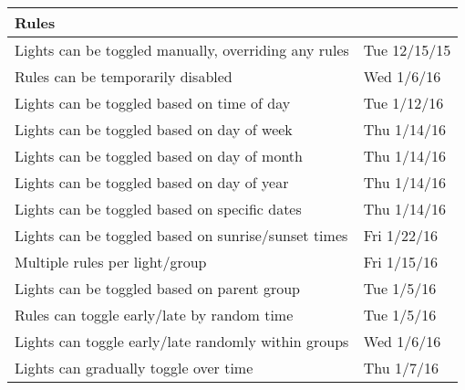 \documentclass[oneside,openright]{book}
\begin{document}
\begin{tabular}{ | l | l | }
   \textbf{Rules} & \\ \hline
   
   Lights can be toggled manually, overriding any rules & Tue 12/15/15 \\ \hline
   Rules can be temporarily disabled & Wed 1/6/16 \\ \hline
   Lights can be toggled based on time of day & Tue 1/12/16 \\ \hline
   Lights can be toggled based on day of week & Thu 1/14/16 \\ \hline
   Lights can be toggled based on day of month & Thu 1/14/16 \\ \hline
   Lights can be toggled based on day of year & Thu 1/14/16 \\ \hline
   Lights can be toggled based on specific dates & Thu 1/14/16 \\ \hline
   Lights can be toggled based on sunrise/sunset times & Fri 1/22/16 \\ \hline
   Multiple rules per light/group & Fri 1/15/16 \\ \hline
   Lights can be toggled based on parent group & Tue 1/5/16 \\ \hline
   Rules can toggle early/late by random time & Tue 1/5/16 \\ \hline
   Lights can toggle early/late randomly within groups & Wed 1/6/16 \\ \hline
   Lights can gradually toggle over time & Thu 1/7/16 \\ \hline
\end{tabular}
\newpage
{}


\end{document}
